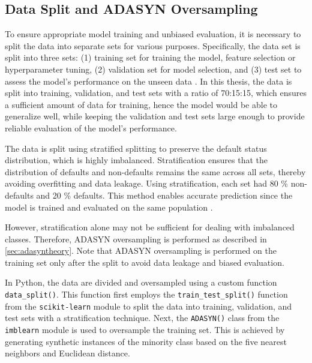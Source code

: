 \subsection{Data Split and ADASYN Oversampling}
\label{subsec:data-split-ADASYN}

To ensure appropriate model training and unbiased evaluation, it is necessary to split the data into separate sets for various purposes. Specifically, the data set is split into three sets: (1) training set for training the model, feature selection or hyperparameter tuning, (2) validation set for model selection, and (3) test set to assess the model's performance on the unseen data \citep{subasi2020practical}.
In this thesis, the data is split into training, validation, and test sets with a ratio of 70:15:15, which ensures a sufficient amount of data for training, hence the model would be able to generalize well, while keeping the validation and test sets large enough to provide reliable evaluation of the model's performance.


The data is split using stratified splitting to preserve the default status distribution, which is highly imbalanced.
Stratification ensures that the distribution of defaults and non-defaults remains the same across all sets, thereby avoiding overfitting and data leakage. Using stratification, each set had 80 \% non-defaults and 20 \% defaults. This method enables accurate prediction since the model is trained and evaluated on the same population \citep{igareta2021strat}.

However, stratification alone may not be sufficient for dealing with imbalanced classes. Therefore, ADASYN oversampling is performed as described in \autoref{sec:adasyntheory}. Note that ADASYN oversampling is performed on the training set only after the split to avoid data leakage and biased evaluation.


In Python, the data are divided and oversampled using a custom function \lstinline{data_split()}.
This function first employs the \lstinline{train_test_split()} function from the \lstinline{scikit-learn} module to split the data into training, validation, and test sets with a stratification technique.
Next, the \lstinline{ADASYN()} class from the \lstinline{imblearn} module is used to oversample the training set. This is achieved by generating synthetic instances of the minority class based on the five nearest neighbors and Euclidean distance.

